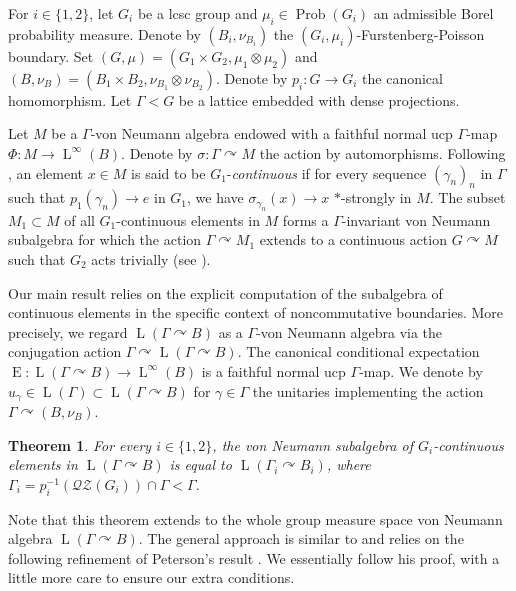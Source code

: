 \documentclass[JEP,XML,SOM,Unicode,published]{cedram}
\newtheorem{thm}{Theorem}[section]
\theoremstyle{definition}
\DeclareMathOperator{\Prob}{Prob}
\DeclareMathOperator{\rE}{ E}
\DeclareMathOperator{\rL}{L}
\begin{document}
For $i \in \{1, 2\}$, let $G_i$ be a lcsc group and $\mu_i \in \Prob(G_i)$ an admissible Borel probability measure. Denote by $(B_i, \nu_{B_i})$ the $(G_i, \mu_i)$-Furstenberg-Poisson boundary. Set $(G, \mu) = (G_1 \times G_2, \mu_1 \otimes \mu_2)$ and $(B, \nu_B) = (B_1 \times B_2, \nu_{B_1} \otimes \nu_{B_2})$. Denote by $p_i : G \to G_i$ the canonical homomorphism. Let $\Gamma < G$ be a lattice embedded with dense projections.

Let $M$ be a $\Gamma$-von Neumann algebra endowed with a faithful normal ucp $\Gamma$-map $\Phi : M \to \rL^\infty(B)$. Denote by $\sigma : \Gamma \curvearrowright M$ the action by automorphisms. Following \cite[Def.\,5.3]{BBHP20}, an element $x \in M$ is said to be $G_1$-\emph{continuous} if for every sequence $(\gamma_n)_n$ in $\Gamma$ such that $p_1(\gamma_n) \to e$ in $G_1$, we have $\sigma_{\gamma_n}(x) \to x$ $\ast$-strongly in $M$. The subset $M_1 \subset M$ of all $G_1$-continuous elements in $M$ forms a $\Gamma$-invariant von Neumann subalgebra for which the action $\Gamma \curvearrowright M_1$ extends to a continuous action $G \curvearrowright M$ such that $G_2$ acts trivially (see \cite[Th.\,5.5]{BBHP20}).

Our main result relies on the explicit computation of the subalgebra of continuous elements in the specific context of noncommutative boundaries. More precisely, we regard $\rL(\Gamma \curvearrowright B)$ as a $\Gamma$-von Neumann algebra via the conjugation action $\Gamma \curvearrowright \rL(\Gamma \curvearrowright B)$. The canonical conditional expectation $\rE : \rL(\Gamma \curvearrowright B) \to \rL^\infty(B)$ is a faithful normal ucp $\Gamma$-map. We denote by $u_\gamma \in \rL(\Gamma) \subset \rL(\Gamma \curvearrowright B)$ for $\gamma \in \Gamma$ the unitaries implementing the action $\Gamma \curvearrowright (B, \nu_B)$.

\begin{thm}\label{thm-continuous}
For every $i \in \{1, 2\}$, the von Neumann subalgebra of $G_i$-continuous elements in $\rL(\Gamma \curvearrowright B)$ is equal to $\rL(\Gamma_i \curvearrowright B_i)$, where $\Gamma_i = p_i^{-1}(\mathscr{Q}\mathscr{Z}(G_i)) \cap \Gamma < \Gamma$.
\end{thm}

Note that this theorem extends \cite[Lem.\,5.4]{BBHP20} to the whole group measure space von Neumann algebra $\rL(\Gamma \curvearrowright B)$. The general approach is similar to \cite[Lem.\,5.4]{BBHP20} and relies on the following refinement of Peterson's result \cite[Lem.\,5.1]{Pe14}. We essentially follow his proof, with a little more care to ensure our extra conditions.
\end{document}
